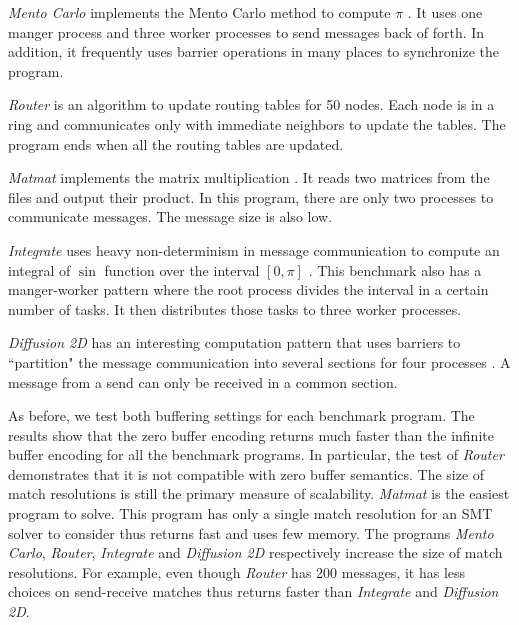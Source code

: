 \begin{compactitem}

\item \textit{Mento Carlo} implements the Mento Carlo method to compute $\pi$ \cite{benchmark:mentoCarlo}. It uses one manger process and three worker processes to send messages back of forth. In addition, it frequently uses barrier operations in many places to synchronize the program. 
\item \textit{Router} is an algorithm to update routing tables for 50 nodes. Each node is in a ring and communicates only with immediate neighbors to update the tables. The program ends when all the routing tables are updated. 
\item \textit{Matmat} implements the matrix multiplication \cite{benchmark:fevs}. It reads two matrices from the files and output their product. In this program, there are only two processes to communicate messages. The message size is also low.
\item \textit{Integrate} uses heavy non-determinism in message communication to compute an integral of $\sin$ function over the interval $[0, \pi]$ \cite{benchmark:fevs}. This benchmark also has a manger-worker pattern where the root process divides the interval in a certain number of tasks. It then distributes those tasks to three worker processes. %
\item \textit{Diffusion 2D} has an interesting computation pattern that uses barriers to ``partition" the message communication into several sections for four processes \cite{benchmark:fevs}. A message from a send can only be received in a common section. 
\end{compactitem}

As before, we test both buffering settings for each benchmark program. The results show that the zero buffer encoding returns much faster than the infinite buffer encoding for all the benchmark programs. In particular, the test of \textit{Router} demonstrates that it is not compatible with zero buffer semantics. The size of match resolutions is still the primary measure of scalability. \textit{Matmat} is the easiest program to solve. This program has only a single match resolution for an SMT solver to consider thus returns fast and uses few memory. The programs \textit{Mento Carlo}, \textit{Router}, \textit{Integrate} and \textit{Diffusion 2D} respectively increase the size of match resolutions. For example, even though \textit{Router} has 200 messages, it has less choices on send-receive matches thus returns faster than \textit{Integrate} and \textit{Diffusion 2D}. 

